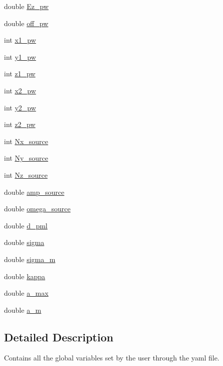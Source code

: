 \begin{DoxyCompactItemize}
\item 
double \hyperlink{classreader_a110c6d591bc270709946c1e5ed24f6d1}{Ez\+\_\+pw}
\item 
double \hyperlink{classreader_aa7745d62b0cc804028efbbf47e9bb60a}{off\+\_\+pw}
\item 
int \hyperlink{classreader_aae4d02deaa1be9570b4f76328b6d4c42}{x1\+\_\+pw}
\item 
int \hyperlink{classreader_a5c5e482cb9440c5975ec0aa67482b2e8}{y1\+\_\+pw}
\item 
int \hyperlink{classreader_a8e84a504d6a8e55482d34f1db450856c}{z1\+\_\+pw}
\item 
int \hyperlink{classreader_ad96b0fe356238c79bac21a63dff992f3}{x2\+\_\+pw}
\item 
int \hyperlink{classreader_a31f454d30a8fa6d4d5bd5cfd8cc56814}{y2\+\_\+pw}
\item 
int \hyperlink{classreader_aca3150cf87a7064974848902c1d1d441}{z2\+\_\+pw}
\item 
int \hyperlink{classreader_a68877887a99638c9df7733ac89abd562}{Nx\+\_\+source}
\item 
int \hyperlink{classreader_a81c46fb2596e303dfd0ffa1ce51637c1}{Ny\+\_\+source}
\item 
int \hyperlink{classreader_a753e712b646921cef7bf3260804eca41}{Nz\+\_\+source}
\item 
double \hyperlink{classreader_a9f95625339dde95714848cc29fec7c3d}{amp\+\_\+source}
\item 
double \hyperlink{classreader_abb9e0914f6536f966d697075963eac27}{omega\+\_\+source}
\item 
double \hyperlink{classreader_addd964c3a3d7100d78867d740ff42887}{d\+\_\+pml}
\item 
double \hyperlink{classreader_ab2abefbaf493aa9fde3c5d8d67ceb1d9}{sigma}
\item 
double \hyperlink{classreader_ac0696a966464fa2b5a02591578a7c677}{sigma\+\_\+m}
\item 
double \hyperlink{classreader_a227a780cfc649c4a952eb97d871ace0f}{kappa}
\item 
double \hyperlink{classreader_a23d9097b5cf8913d462255a910f5d667}{a\+\_\+max}
\item 
double \hyperlink{classreader_ad062a51c4b46d9d4b6cc09d80ffa2866}{a\+\_\+m}
\end{DoxyCompactItemize}


\subsection{Detailed Description}
Contains all the global variables set by the user through the yaml file. 

